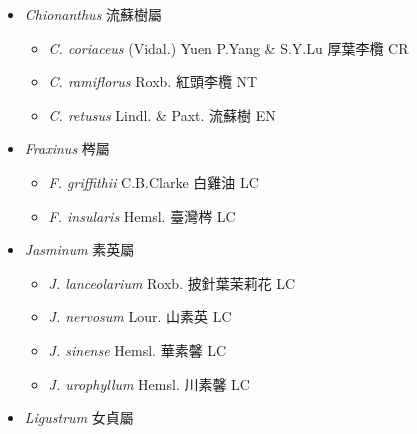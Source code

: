 
  \begin{itemize}
 \item[] \textit{Chionanthus} 流蘇樹屬
                                
  \begin{itemize}
        \item[] \textit{C. coriaceus} (Vidal.) Yuen P.Yang \& S.Y.Lu  厚葉李欖   CR
        \item[] \textit{C. ramiflorus} Roxb.  紅頭李欖   NT
        \item[] \textit{C. retusus} Lindl. \& Paxt.  流蘇樹   EN
  \end{itemize}
 \item[] \textit{Fraxinus} 梣屬
                                
  \begin{itemize}
        \item[] \textit{F. griffithii} C.B.Clarke  白雞油   LC
        \item[] \textit{F. insularis} Hemsl.  臺灣梣   LC
  \end{itemize}
 \item[] \textit{Jasminum} 素英屬
                                
  \begin{itemize}
        \item[] \textit{J. lanceolarium} Roxb.  披針葉茉莉花   LC
        \item[] \textit{J. nervosum} Lour.  山素英   LC
        \item[] \textit{J. sinense} Hemsl.  華素馨   LC
        \item[] \textit{J. urophyllum} Hemsl.  川素馨   LC
  \end{itemize}
 \item[] \textit{Ligustrum} 女貞屬
                                

\end{itemize}

